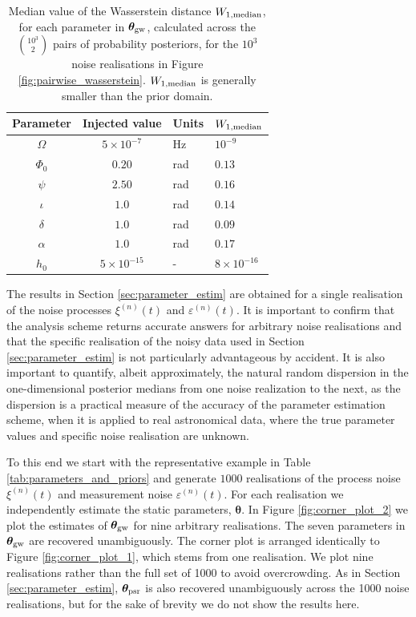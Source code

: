 \documentclass[fleqn,usenatbib,useAMS]{mnras}
\begin{document}
\begin{table}
	\centering
	\begin{tabular}{ccll}
		\toprule
		Parameter & Injected value & Units & $W_{1, \rm median}$  \\
		\hline
		$\Omega$     &   $5 \times 10^{-7}$ & Hz & $10^{-9}$ \\
		$\Phi_0$          & $0.20$ & rad & $0.13$ \\
		$\psi$              & $2.50$ & rad & $0.16$ \\
		$\iota$             & $1.0$ & rad & $0.14$ \\ 
		$\delta$              & $1.0$  & rad & $0.09$ \\
		$\alpha$          & $1.0$  & rad & $0.17$\\
		$h_0$            & $5 \times 10^{-15}$ & - & $8 \times 10^{-16}$ \\
		\bottomrule
	\end{tabular}
	\caption{Median value of the Wasserstein distance $W_{1, \rm median}$, for each parameter in $\boldsymbol{\theta}_{\rm gw}$, calculated across the $10^3 \choose 2$ pairs of probability posteriors, for the $10^3$ noise realisations in Figure \ref{fig:pairwise_wasserstein}. $W_{1, \rm median}$ is generally smaller than the prior domain.}
	\label{tab:Wasserstein}
\end{table}

The results in Section \ref{sec:parameter_estim} are obtained for a single realisation of the noise processes $\xi^{(n)}(t)$ and $\varepsilon^{(n)}(t)$. It is important to confirm that the analysis scheme returns accurate answers for arbitrary noise realisations and that the specific realisation of the noisy data used in Section \ref{sec:parameter_estim} is not particularly advantageous by accident. It is also important to quantify, albeit approximately, the natural random dispersion in the one-dimensional posterior medians from one noise realization to the next, as the dispersion is a practical measure of the accuracy of the parameter estimation scheme, when it is applied to real astronomical data, where the true parameter values and specific noise realisation are unknown. \newline 

To this end we start with the representative example in Table \ref{tab:parameters_and_priors} and generate $1000$ realisations of the process noise $\xi^{(n)}(t)$ and measurement noise $\varepsilon^{(n)}(t)$. For each realisation we independently estimate the static parameters, $\boldsymbol{\theta}$. In Figure \ref{fig:corner_plot_2} we plot the estimates of $\boldsymbol{\theta}_{\rm gw}$ for nine arbitrary realisations. The seven parameters in ${\boldsymbol{\theta}}_{\rm gw}$ are recovered unambiguously. The corner plot is arranged identically to Figure \ref{fig:corner_plot_1}, which stems from one realisation. We plot nine realisations rather than the full set of 1000 to avoid overcrowding. As in Section \ref{sec:parameter_estim}, $\boldsymbol{\theta}_{\rm psr}$ is also recovered unambiguously across the 1000 noise realisations, but for the sake of brevity we do not show the results here. \newline 
\end{document}
